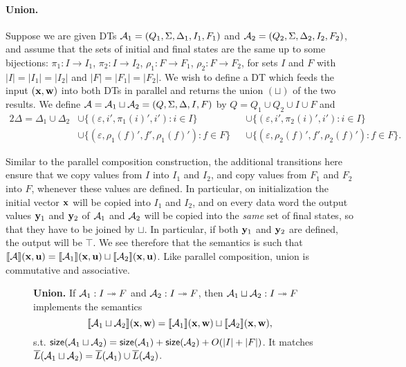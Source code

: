 \paragraph*{Union.}
Suppose we are given DTs $\mathcal{A}_1 = (Q_{1}, \Sigma, \Delta_{1}, I_{1}, F_{1})$ and $\mathcal{A}_2 = (Q_{2}, \Sigma, \Delta_{2}, I_{2}, F_{2})$, and assume that the sets of initial and final states are the same up to some bijections: $\pi_1: I \to I_1$, $\pi_2: I \to I_2$, $\rho_1: F \to F_1$, $\rho_2: F \to F_2$, for sets $I$ and $F$ with $|I| = |I_1| = |I_2|$ and $|F| = |F_1| = |F_2|$. We wish to define a DT which feeds the input $(\mathbf{x},\mathbf{w})$ into both DTs in parallel and returns the union $(\sqcup)$ of the two results.
We define $\mathcal{A} = \mathcal{A}_1 \sqcup \mathcal{A}_2 = (Q, \Sigma, \Delta, I, F){}$ by $Q = Q_1 \cup Q_2 \cup I \cup F$ and
\begin{alignat*}{2}
\Delta = \Delta_1 \cup \Delta_2
    &\cup \big\{(\varepsilon, i', \pi_1(i)', i') : i \in I \big\}
    &&\cup \big\{(\varepsilon, i', \pi_2(i)', i') : i \in I \big\} \\
    &\cup \big\{(\varepsilon, \rho_1(f)', f', \rho_1(f)') : f \in F \big\}
    &&\cup \big\{(\varepsilon, \rho_2(f)', f', \rho_2(f)') : f \in F \big\}.
\end{alignat*}

Similar to the parallel composition construction, the additional transitions here ensure that we copy values from $I$ into $I_1$ and $I_2$, and copy values from $F_1$ and $F_2$ into $F$, whenever these values are defined. In particular, on initialization the initial vector $\mathbf{x}$ will be copied into $I_1$ and $I_2$, and on every data word the output values $\mathbf{y}_1$ and $\mathbf{y}_2$ of $\mathcal{A}_1$ and $\mathcal{A}_2$ will be copied into the \emph{same} set of final states, so that they have to be joined by $\sqcup$. In particular, if both $\mathbf{y}_1$ and $\mathbf{y}_2$ are defined, the output will be $\top$. We see therefore that the semantics is such that $\llbracket \mathcal{A} \rrbracket(\mathbf{x},\mathbf{u}) = \llbracket \mathcal{A}_1 \rrbracket(\mathbf{x},\mathbf{u}) \sqcup \llbracket \mathcal{A}_2 \rrbracket(\mathbf{x},\mathbf{u})$. Like parallel composition, union is commutative and associative.

\begin{figure}[H]
\begin{dtbox}
\textbf{Union.}
If $\mathcal{A}_1: I \twoheadrightarrow F$ and $\mathcal{A}_2: I \twoheadrightarrow F$,
then $\mathcal{A}_1 \sqcup \mathcal{A}_2 : I \twoheadrightarrow F$
implements the semantics
\[
\llbracket \mathcal{A}_1 \sqcup \mathcal{A}_2 \rrbracket(\mathbf{x},\mathbf{w}) = \llbracket \mathcal{A}_1 \rrbracket(\mathbf{x},\mathbf{w}) \sqcup \llbracket \mathcal{A}_2 \rrbracket(\mathbf{x},\mathbf{w}),
\]
s.t. $\mathsf{size}(\mathcal{A}_1 \sqcup \mathcal{A}_2) = \mathsf{size}(\mathcal{A}_1) + \mathsf{size}(\mathcal{A}_2) + O(|I| + |F|)$.
It matches
$\overline{L}(\mathcal{A}_1 \sqcup \mathcal{A}_2) = \overline{L}(\mathcal{A}_1) \cup \overline{L}(\mathcal{A}_2)$.
\end{dtbox}

\label{dt:fig:union}
\end{figure}

